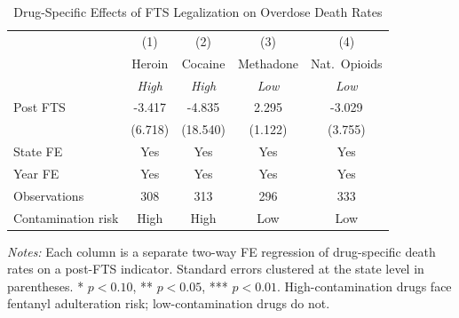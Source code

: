 \begin{table}[H]
\centering
\caption{Drug-Specific Effects of FTS Legalization on Overdose Death Rates}
\label{tab:drugspec}
\begin{threeparttable}
\begin{tabular}{lcccc}
\toprule
 & (1) & (2) & (3) & (4) \\
 & Heroin & Cocaine & Methadone & Nat.\ Opioids \\
 & \textit{High} & \textit{High} & \textit{Low} & \textit{Low} \\
\midrule
Post FTS & -3.417 & -4.835 & 2.295\sym{**} & -3.029 \\
 & (6.718) & (18.540) & (1.122) & (3.755) \\
\midrule
State FE & Yes & Yes & Yes & Yes \\
Year FE & Yes & Yes & Yes & Yes \\
Observations & 308 & 313 & 296 & 333 \\
Contamination risk & High & High & Low & Low \\
\bottomrule
\end{tabular}
\begin{tablenotes}[flushleft]
\small
\item \textit{Notes:} Each column is a separate two-way FE regression of drug-specific death rates on a post-FTS indicator. Standard errors clustered at the state level in parentheses. * $p<0.10$, ** $p<0.05$, *** $p<0.01$. High-contamination drugs face fentanyl adulteration risk; low-contamination drugs do not.
\end{tablenotes}
\end{threeparttable}
\end{table}

